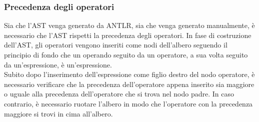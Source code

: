 \subsubsection{Precedenza degli operatori}
Sia che l'AST venga generato da ANTLR, sia che venga generato manualmente, è necessario
che l'AST rispetti la precedenza degli operatori. In fase di costruzione dell'AST,
gli operatori vengono inseriti come nodi dell'albero seguendo il principio di fondo 
che un operando seguito da un operatore, a sua volta seguito da un'espressione, è 
un'espressione. \\ 

Subito dopo l'inserimento dell'espressione come figlio destro del nodo operatore,
è necessario verificare che la precedenza dell'operatore appena inserito sia maggiore
o uguale alla precedenza dell'operatore che si trova nel nodo padre. In caso contrario,
è necessario ruotare l'albero in modo che l'operatore con la precedenza maggiore si
trovi in cima all'albero. \\

